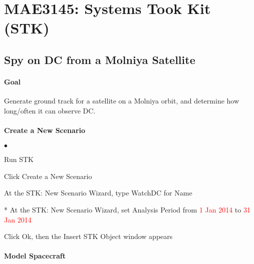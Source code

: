 \documentclass[10pt]{article}
\date{}
\theoremstyle{plain}\theorembodyfont{\normalfont}
\renewcommand\emph[1]{\textsf{#1}}
\begin{document}
\pagestyle{empty}
\section*{MAE3145: Systems Took Kit (STK)}
\vspace*{-0.4cm}

\subsection{Spy on DC from a Molniya Satellite}

\paragraph{Goal} Generate ground track for a satellite on a Molniya orbit, and determine how long/often it can observe DC.


\paragraph{Create a New Scenario}
\begin{list}{$\bullet$}
{\setlength{\itemsep}{-3pt}\setlength{\leftmargin}{30pt}}
\item Run STK
\item Click  \emph{Create a New Scenario}
\item At the \emph{STK: New Scenario Wizard}, type \emph{WatchDC} for \emph{Name} 
\item[*] At the \emph{STK: New Scenario Wizard}, set \emph{Analysis Period} from \textcolor{red}{\emph{1 Jan 2014}} to \textcolor{red}{\emph{31 Jan 2014}}
\item Click \emph{Ok}, then the \emph{Insert STK Object} window appears
\end{list}



\paragraph{Model Spacecraft}
\end{document}
